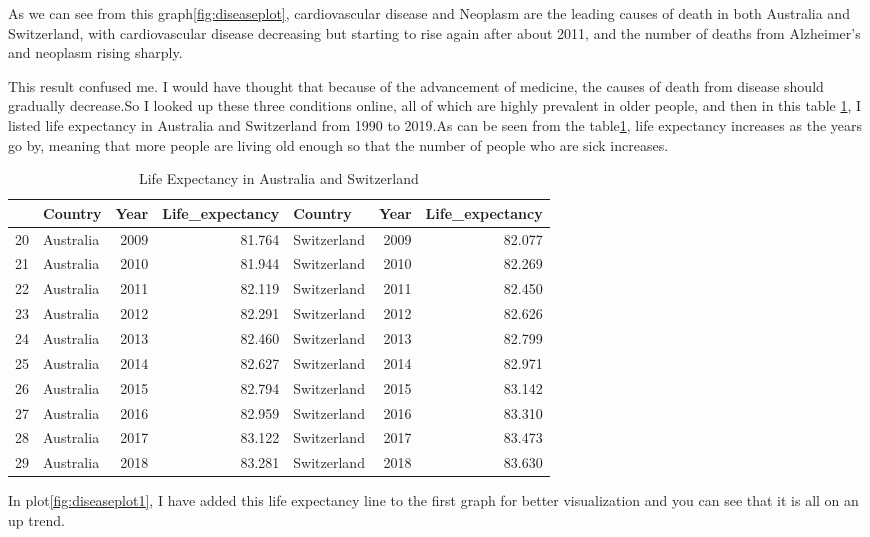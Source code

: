 \documentclass[11pt,a4paper,]{article}
\begin{document}
As we can see from this graph\ref{fig:diseaseplot}, cardiovascular disease and Neoplasm are the leading causes of death in both Australia and Switzerland, with cardiovascular disease decreasing but starting to rise again after about 2011, and the number of deaths from Alzheimer's and neoplasm rising sharply.

This result confused me. I would have thought that because of the advancement of medicine, the causes of death from disease should gradually decrease.So I looked up these three conditions online, all of which are highly prevalent in older people, and then in this table \ref{tab:lifeexpendcy}, I listed life expectancy in Australia and Switzerland from 1990 to 2019.As can be seen from the table\ref{tab:lifeexpendcy}, life expectancy increases as the years go by, meaning that more people are living old enough so that the number of people who are sick increases.

\begin{table}

\caption{\label{tab:lifeexpendcy}Life Expectancy in Australia and Switzerland}
\centering
\begin{tabular}[t]{l|l|r|r|l|r|r}
\hline
  & Country & Year & Life\_expectancy & Country & Year & Life\_expectancy\\
\hline
20 & Australia & 2009 & 81.764 & Switzerland & 2009 & 82.077\\
\hline
21 & Australia & 2010 & 81.944 & Switzerland & 2010 & 82.269\\
\hline
22 & Australia & 2011 & 82.119 & Switzerland & 2011 & 82.450\\
\hline
23 & Australia & 2012 & 82.291 & Switzerland & 2012 & 82.626\\
\hline
24 & Australia & 2013 & 82.460 & Switzerland & 2013 & 82.799\\
\hline
25 & Australia & 2014 & 82.627 & Switzerland & 2014 & 82.971\\
\hline
26 & Australia & 2015 & 82.794 & Switzerland & 2015 & 83.142\\
\hline
27 & Australia & 2016 & 82.959 & Switzerland & 2016 & 83.310\\
\hline
28 & Australia & 2017 & 83.122 & Switzerland & 2017 & 83.473\\
\hline
29 & Australia & 2018 & 83.281 & Switzerland & 2018 & 83.630\\
\hline
\end{tabular}
\end{table}

In plot\ref{fig:diseaseplot1}, I have added this life expectancy line to the first graph for better visualization and you can see that it is all on an up trend.
\end{document}

